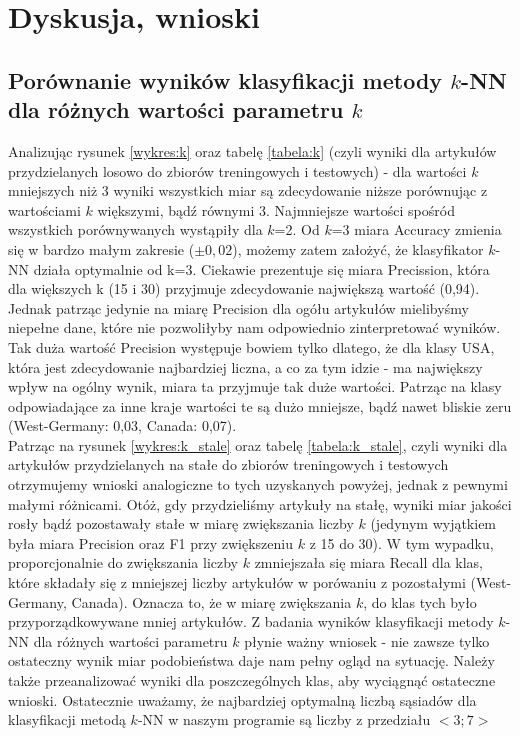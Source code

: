 \documentclass{classrep}
\begin{document}
\clearpage
\section{Dyskusja, wnioski}
\subsection{Porównanie wyników klasyfikacji metody $k$-NN dla różnych wartości parametru $k$}

Analizując rysunek \ref{wykres:k} oraz tabelę \ref{tabela:k} (czyli wyniki dla artykułów przydzielanych losowo do zbiorów treningowych i testowych) - dla wartości $k$ mniejszych niż 3 wyniki wszystkich miar są zdecydowanie niższe porównując z wartościami $k$ większymi, bądź równymi 3. Najmniejsze wartości spośród wszystkich porównywanych wystąpiły dla $k$=2. Od $k$=3 miara Accuracy zmienia się w bardzo małym zakresie ($\pm 0,02$), możemy zatem założyć, że klasyfikator $k$-NN działa optymalnie od k=3. Ciekawie prezentuje się miara Precission, która dla większych k (15 i 30) przyjmuje zdecydowanie największą wartość (0,94). Jednak patrząc jedynie na miarę Precision dla ogółu artykułów mielibyśmy niepełne dane, które nie pozwoliłyby nam odpowiednio zinterpretować wyników. Tak duża wartość Precision występuje bowiem tylko dlatego, że dla klasy USA, która jest zdecydowanie najbardziej liczna, a co za tym idzie - ma największy wpływ na ogólny wynik, miara ta przyjmuje tak duże wartości. Patrząc na klasy odpowiadające za inne kraje wartości te są dużo mniejsze, bądź nawet bliskie zeru (West-Germany: 0,03, Canada: 0,07).\\
\indent Patrząc na rysunek \ref{wykres:k_stale} oraz tabelę \ref{tabela:k_stale}, czyli wyniki dla artykułów przydzielanych na stałe do zbiorów treningowych i testowych otrzymujemy wnioski analogiczne to tych uzyskanych powyżej, jednak z pewnymi małymi różnicami. Otóż, gdy przydzieliśmy artykuły na stałę, wyniki miar jakości rosły bądź pozostawały stałe w miarę zwiększania liczby $k$ (jedynym wyjątkiem była miara Precision oraz F1 przy zwiększeniu $k$ z 15 do 30). W tym wypadku, proporcjonalnie do zwiększania liczby $k$ zmniejszała się miara Recall dla klas, które składały się z mniejszej liczby artykułów w porówaniu z pozostałymi (West-Germany, Canada). Oznacza to, że w miarę zwiększania $k$, do klas tych było przyporządkowywane mniej artykułów. Z badania wyników klasyfikacji metody $k$-NN dla różnych wartości parametru $k$ płynie ważny wniosek - nie zawsze tylko ostateczny wynik miar podobieństwa daje nam pełny ogląd na sytuację. Należy także przeanalizować wyniki dla poszczególnych klas, aby wyciągnąć ostateczne wnioski. Ostatecznie uważamy, że najbardziej optymalną liczbą sąsiadów dla klasyfikacji metodą $k$-NN w naszym programie są liczby z przedziału $<3;7>$ 
\end{document}
